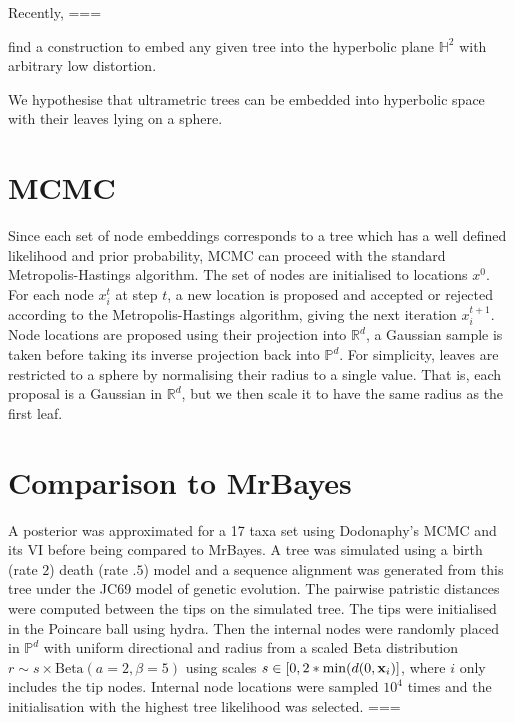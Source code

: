 \documentclass[11pt, twocolumn]{article}
\begin{document}
Recently, \cite{chami2020trees} ===

\cite{sarkar2012low} find a construction  to embed any given tree into the hyperbolic plane $\mathbb{H}^{2}$ with arbitrary low distortion.

We hypothesise that ultrametric trees can be embedded into hyperbolic space with their leaves lying on a sphere.

\section{MCMC}
Since each set of node embeddings corresponds to a tree which has a well defined likelihood and prior probability, MCMC can proceed with the standard Metropolis-Hastings algorithm.
The set of nodes are initialised to locations $x^{0}$.
For each node $x_{i}^t$ at step $t$, a new location is proposed and accepted or rejected according to the Metropolis-Hastings algorithm, giving the next iteration $x_i^{t+1}$.
Node locations are proposed using their projection into $\mathbb{R}^d$, a Gaussian sample is taken before taking its inverse projection back into $\mathbb{P}^d$.
For simplicity, leaves are restricted to a sphere by normalising their radius to a single value.
That is, each proposal is a Gaussian in $\mathbb{R}^d$, but we then scale it to have the same radius as the first leaf.


\section{Comparison to MrBayes}
A posterior was approximated for a 17 taxa set using Dodonaphy's MCMC and its VI before being compared to MrBayes.
A tree was simulated using a birth (rate $2$) death (rate $.5$) model and a sequence alignment was generated from this tree under the JC69 model of genetic evolution.
The pairwise patristic distances were computed between the tips on the simulated tree.
The tips were initialised in the Poincare ball using hydra.
Then the internal nodes were randomly placed in $\mathbb{P}^{d}$ with uniform directional and radius from a scaled Beta distribution $ r \sim s \times \text{Beta}(a=2, \beta=5)$ using scales $s \in [0, 2*\min(d(0, \bold{x}_{i})]$, where $i$ only includes the tip nodes.
Internal node locations were sampled $10^{4}$ times and the initialisation with the highest tree likelihood was selected.
===
\end{document}
